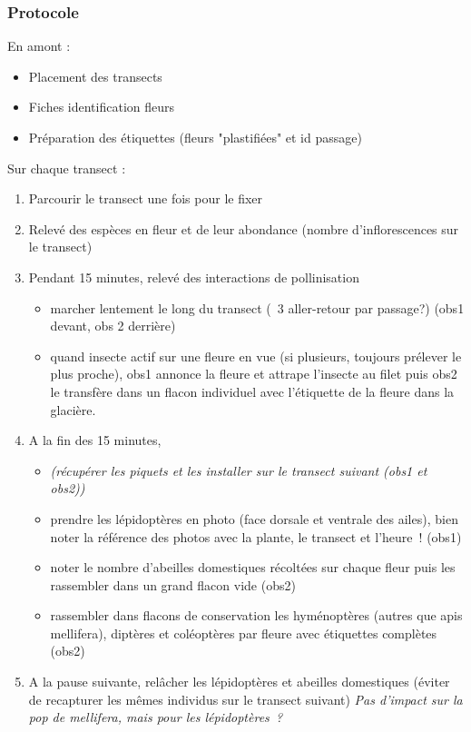 \documentclass{article}
\begin{document}
	\subsubsection{Protocole}
	\begin{flushleft}
		En amont :
	\end{flushleft}
	\begin{itemize}
		\item Placement des transects
		\item Fiches identification fleurs
		\item Préparation des étiquettes (fleurs "plastifiées" et id passage)
	\end{itemize}
	Sur chaque transect :
	\begin{enumerate}
		\item Parcourir le transect une fois pour le fixer
		\item Relevé des espèces en fleur et de leur abondance (nombre d’inflorescences sur le transect)
		\item Pendant 15 minutes, relevé des interactions de pollinisation 
		\begin{itemize}
			\item marcher lentement le long du transect (~3 aller-retour par passage?) (obs1 devant, obs 2 derrière)
			\item quand insecte actif sur une fleure en vue (si plusieurs, toujours prélever le plus proche), obs1 annonce la fleure et attrape l'insecte au filet puis obs2 le transfère dans un flacon individuel avec l'étiquette de la fleure dans la glacière.
		\end{itemize}
		\item A la fin des 15 minutes, 
		\begin{itemize}
			\item \textit{(récupérer les piquets et les installer sur le transect suivant (obs1 et obs2))}
			\item prendre les lépidoptères en photo (face dorsale et ventrale des ailes), bien noter la référence des photos avec la plante, le transect et l’heure ! (obs1)
			\item noter le nombre d’abeilles domestiques récoltées sur chaque fleur puis les rassembler dans un grand flacon vide (obs2)
			\item rassembler dans flacons de conservation les hyménoptères (autres que apis mellifera), diptères et coléoptères par fleure avec étiquettes complètes (obs2)
		\end{itemize}
		\item A la pause suivante, relâcher les lépidoptères et abeilles domestiques (éviter de recapturer les mêmes individus sur le transect suivant) \textit{Pas d’impact sur la pop de mellifera, mais pour les lépidoptères ?}
	\end{enumerate}
\end{document}
